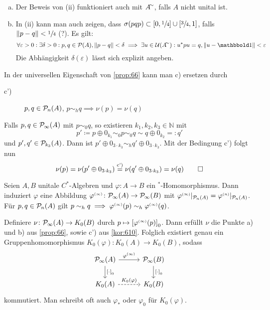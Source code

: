 \begin{bemerkung}[label=bem:69]
	\begin{enumerate}[a)]
		\item Der Beweis von (ii) funktioniert auch mit $A^\simm$, falls $A$ nicht unital ist.
		\item In (ii) kann man auch zeigen, dass $\sigma(p qp) \subset [0,\sfrac{1}{4}] \cup [\sfrac{3}{4},1]$, falls $\norm*{p-q} < \sfrac{1}{4}$ (?).
		Es gilt: 
		\[
			\forall \varepsilon>0 : \exists \delta>0 : p,q \in \mathcal{P}(A), \norm*{p-q}<\delta \implies \exists u \in \mathcal{U}(A^\simm) : u^* pu = q , \norm*{u-\ind} < \varepsilon
		\]
		Die Abhängigkeit $\delta(\varepsilon)$ lässt sich explizit angeben.
	\end{enumerate}
\end{bemerkung}

\begin{korollar}[label=kor:610]
	In der universellen Eigenschaft von \autoref{prop:66} kann man c) ersetzen durch
	\begin{description}
		\item[c')] $p,q \in \kernedP_n(A)$, $p \sim_h q \implies \nu(p) = \nu(q)$
	\end{description}
\end{korollar}
\begin{beweis}
	Falls $p,q \in \kernedP_\infty(A)$ mit $p \sim_0 q$, so existieren $k_1,k_2,k_3 \in \mathbb{N}$ mit 
	\[
		p' \coloneqq p \oplus 0_{k_1} \sim_0 p \sim_0 q \sim q \oplus 0_{k_2} =: q'
	\]
	und $p',q' \in \kernedP_{k_3}(A)$.
	Dann ist $p' \oplus 0_{3 \cdot k_3} \sim_h q' \oplus 0_{3 \cdot k_3}$.
	Mit der Bedingung c') folgt nun
	\[
		\nu(p) = \nu \enbrace*{p' \oplus 0_{3 \cdot k_3}} \StackText{c')}{=} \nu \enbrace*{q' \oplus 0_{3 \cdot k_3}} = \nu(q) \qedhere
	\]
\end{beweis}

Seien $A,B$ unitale $C^*$-Algebren und $\varphi \colon A \to B$ ein $^*$-Homomorphismus.
Dann induziert $\varphi$ eine Abbildung $\varphi^\ssbrace{\infty} \colon \Pinfty(A) \to \Pinfty(B)$ mit $\varphi^\ssbrace{\infty}|_{\kernedP_n(A) } = \varphi^\ssbrace{n}|_{\kernedP_n(A)}$.
Für $p,q \in \kernedP_n(A)$ gilt $p \sim_h q \implies \varphi^\ssbrace{\infty}(p) \sim_h \varphi^\ssbrace{\infty}(q)$.

Definiere $\nu \colon \Pinfty(A) \to K_0(B)$ durch $p \mapsto \benbrace*{\varphi^\ssbrace{\infty}(p)}_0$.
Dann erfüllt $\nu$ die Punkte a) und b) aus \autoref{prop:66}, sowie c') aus \autoref{kor:610}.
Folglich existiert genau ein Gruppenhomomorphismus $K_0(\varphi) \colon K_0(A) \to K_0(B)$, sodass
\[
	\begin{tikzcd}[column sep=3em]
		\Pinfty(A) \dar["\benbrace*{\cdot}_0"] \rar["\varphi^\ssbrace{\infty}"] & \Pinfty(B) \dar["\benbrace*{\cdot}_0"] \\
		K_0(A) \rar[dashed,"K_0(\varphi)"] & K_0(B)
	\end{tikzcd}
\]
kommutiert.
Man schreibt oft auch $\varphi_*$ oder $\varphi_0$ für $K_0(\varphi)$.

